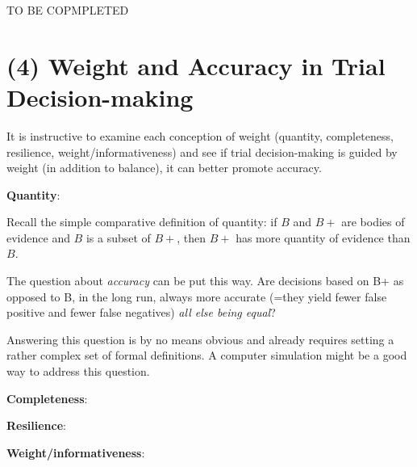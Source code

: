 \documentclass[
  10pt,
  dvipsnames,enabledeprecatedfontcommands]{scrartcl}
\begin{document}
TO BE COPMPLETED

\hypertarget{weight-and-accuracy-in-trial-decision-making}{%
\section{(4) Weight and Accuracy in Trial
Decision-making}\label{weight-and-accuracy-in-trial-decision-making}}

It is instructive to examine each conception of weight (quantity,
completeness, resilience, weight/informativeness) and see if trial
decision-making is guided by weight (in addition to balance), it can
better promote accuracy.

\textbf{Quantity}:

Recall the simple comparative definition of quantity: if \(B\) and
\(B+\) are bodies of evidence and \(B\) is a subset of \(B+\), then
\(B+\) has more quantity of evidence than \(B\).

The question about \emph{accuracy} can be put this way. Are decisions
based on B+ as opposed to B, in the long run, always more accurate
(=they yield fewer false positive and fewer false negatives)
\textit{all else being equal}?

Answering this question is by no means obvious and already requires
setting a rather complex set of formal definitions. A computer
simulation might be a good way to address this question.

\textbf{Completeness}:

\textbf{Resilience}:

\textbf{Weight/informativeness}:
\end{document}
